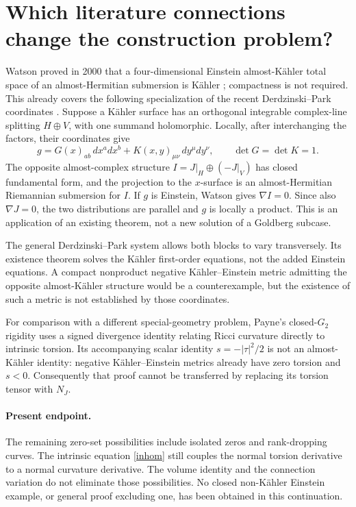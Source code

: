 \documentclass[11pt]{article}
\begin{document}
\section{Which literature connections change the construction problem?}
Watson proved in 2000 that a four-dimensional Einstein almost-K\"ahler total space of an almost-Hermitian submersion is K\"ahler \cite{Watson}; compactness is not required. This already covers the following specialization of the recent Derdzinski--Park coordinates \cite[Theorems D and F]{DP}. Suppose a K\"ahler surface has an orthogonal integrable complex-line splitting $H\oplus V$, with one summand holomorphic. Locally, after interchanging the factors, their coordinates give
\[
g=G(x)_{ab}\,dx^a dx^b+K(x,y)_{\mu\nu}\,dy^\mu dy^\nu,
\qquad \det G=\det K=1.
\]
The opposite almost-complex structure $I=J|_H\oplus(-J|_V)$ has closed fundamental form, and the projection to the $x$-surface is an almost-Hermitian Riemannian submersion for $I$. If $g$ is Einstein, Watson gives $\nabla I=0$. Since also $\nabla J=0$, the two distributions are parallel and $g$ is locally a product. This is an application of an existing theorem, not a new solution of a Goldberg subcase.

The general Derdzinski--Park system allows both blocks to vary transversely. Its existence theorem solves the K\"ahler first-order equations, not the added Einstein equations. A compact nonproduct negative K\"ahler--Einstein metric admitting the opposite almost-K\"ahler structure would be a counterexample, but the existence of such a metric is not established by those coordinates.

For comparison with a different special-geometry problem, Payne's closed-$G_2$ rigidity \cite{Payne} uses a signed divergence identity relating Ricci curvature directly to intrinsic torsion. Its accompanying scalar identity $s=-|\tau|^2/2$ is not an almost-K\"ahler identity: negative K\"ahler--Einstein metrics already have zero torsion and $s<0$. Consequently that proof cannot be transferred by replacing its torsion tensor with $N_J$.

\paragraph{Present endpoint.}
The remaining zero-set possibilities include isolated zeros and rank-dropping curves. The intrinsic equation \eqref{inhom} still couples the normal torsion derivative to a normal curvature derivative. The volume identity and the connection variation do not eliminate those possibilities. No closed non-K\"ahler Einstein example, or general proof excluding one, has been obtained in this continuation.
\end{document}
